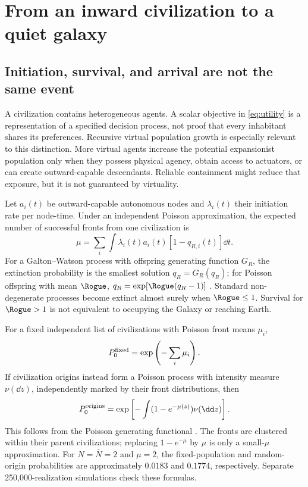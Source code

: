 \section{From an inward civilization to a quiet galaxy}
\label{sec:population}

\subsection{Initiation, survival, and arrival are not the same event}

A civilization contains heterogeneous agents. A scalar objective in \cref{eq:utility} is a representation of a specified decision process, not proof that every inhabitant shares its preferences. Recursive virtual population growth is especially relevant to this distinction. More virtual agents increase the potential expansionist population only when they possess physical agency, obtain access to actuators, or can create outward-capable descendants. Reliable containment might reduce that exposure, but it is not guaranteed by virtuality.

Let $a_i(t)$ be outward-capable autonomous nodes and $\lambda_i(t)$ their initiation rate per node-time. Under an independent Poisson approximation, the expected number of successful fronts from one civilization is
\begin{equation}
 \mu=\sum_i\int\lambda_i(t)a_i(t)[1-q_{R,i}(t)]\dd t.
 \label{eq:mu}
\end{equation}
For a Galton--Watson process with offspring generating function $G_R$, the extinction probability is the smallest solution $q_R=G_R(q_R)$; for Poisson offspring with mean $\Rogue$, $q_R=\exp[\Rogue(q_R-1)]$ \citep{Harris1963}. Standard non-degenerate processes become extinct almost surely when $\Rogue\leq1$. Survival for $\Rogue>1$ is not equivalent to occupying the Galaxy or reaching Earth.

For a fixed independent list of civilizations with Poisson front means $\mu_i$,
\begin{equation}
 P_0^{\rm fixed}=\exp\left(-\sum_i\mu_i\right).
 \label{eq:fixed}
\end{equation}
If civilization origins instead form a Poisson process with intensity measure $\nu(\dd z)$, independently marked by their front distributions, then
\begin{equation}
 P_0^{\rm origins}=\exp\left[-\int(1-e^{-\mu(z)})\nu(\dd z)\right].
 \label{eq:origins}
\end{equation}
This follows from the Poisson generating functional \citep{LastPenrose2017}. The fronts are clustered within their parent civilizations; replacing $1-e^{-\mu}$ by $\mu$ is only a small-$\mu$ approximation. For $N=\bar N=2$ and $\mu=2$, the fixed-population and random-origin probabilities are approximately $0.0183$ and $0.1774$, respectively. Separate 250,000-realization simulations check these formulas.

